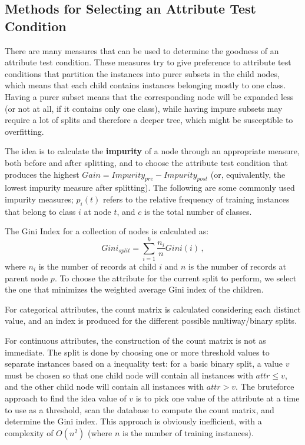 \subsection{Methods for Selecting an Attribute Test Condition}

There are many measures that can be used to determine the goodness of an attribute test condition. These measures try to give preference to attribute test conditions that partition the instances into purer subsets in the child nodes, which means that each child contains instances belonging mostly to one class. Having a purer subset means that the corresponding node will be expanded less (or not at all, if it contains only one class), while having impure subsets may require a lot of splits and therefore a deeper tree, which might be susceptible to overfitting.

The idea is to calculate the \textbf{impurity} of a node through an appropriate measure, both before and after splitting, and to choose the attribute test condition that produces the highest $\textit{Gain} = \textit{Impurity}_{\textit{pre}} - \textit{Impurity}_{\textit{post}}$ (or, equivalently, the lowest impurity measure after splitting). The following are some commonly used impurity measures; $p_i(t)$ refers to the relative frequency of training instances that belong to class $i$ at node $t$, and $c$ is the total number of classes.

The Gini Index for a collection of nodes is calculated as:
\begin{equation*}
    \textit{Gini}_{\textit{split}} = \sum_{i=1}^k \dfrac{n_i}{n} \textit{Gini}(i) \,,
\end{equation*}
where $n_i$ is the number of records at child $i$ and $n$ is the number of records at parent node $p$. To choose the attribute for the current split to perform, we select the one that minimizes the weighted average Gini index of the children.

For categorical attributes, the count matrix is calculated considering each distinct value, and an index is produced for the different possible multiway/binary splits.

For continuous attributes, the construction of the count matrix is not as immediate. The split is done by choosing one or more threshold values to separate instances based on a inequality test: for a basic binary split, a value $v$ must be chosen so that one child node will contain all instances with $\textit{attr} \leq v$, and the other child node will contain all instances with $\textit{attr} > v$. The bruteforce approach to find the idea value of $v$ is to pick one value of the attribute at a time to use as a threshold, scan the database to compute the count matrix, and determine the Gini index. This approach is obviously inefficient, with a complexity of $O(n^2)$ (where $n$ is the number of training instances).

